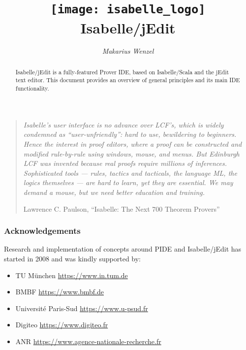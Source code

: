 \documentclass[12pt,a4paper]{report}
\title{\texttt{[image: isabelle\_logo]} \\[4ex] Isabelle/jEdit}
\author{\emph{Makarius Wenzel}}
\begin{document}
\maketitle

\begin{abstract}
  Isabelle/jEdit is a fully-featured Prover IDE, based on Isabelle/Scala and
  the jEdit text editor. This document provides an overview of general
  principles and its main IDE functionality.
\end{abstract}

\vspace*{2.5cm}

\begin{quote}
  {\small\em Isabelle's user interface is no advance over LCF's, which is
  widely condemned as ``user-unfriendly'': hard to use, bewildering to
  beginners. Hence the interest in proof editors, where a proof can be
  constructed and modified rule-by-rule using windows, mouse, and menus. But
  Edinburgh LCF was invented because real proofs require millions of
  inferences. Sophisticated tools --- rules, tactics and tacticals, the
  language ML, the logics themselves --- are hard to learn, yet they are
  essential. We may demand a mouse, but we need better education and
  training.}

  Lawrence C. Paulson, ``Isabelle: The Next 700 Theorem Provers''
\end{quote}


\vspace*{2.5cm}


\subsubsection*{Acknowledgements}

Research and implementation of concepts around PIDE and Isabelle/jEdit has
started in 2008 and was kindly supported by:
\begin{itemize}
\item TU M\"unchen \url{https://www.in.tum.de}
\item BMBF \url{https://www.bmbf.de}
\item Universit\'e Paris-Sud \url{https://www.u-psud.fr}
\item Digiteo \url{https://www.digiteo.fr}
\item ANR \url{https://www.agence-nationale-recherche.fr}
\end{itemize}


\tableofcontents
\listoffigures
\clearfirst



\begingroup
  \tocentry{\bibname}
   \small\raggedright\frenchspacing
  
\endgroup

\tocentry{\indexname}
\printindex
\end{document}

